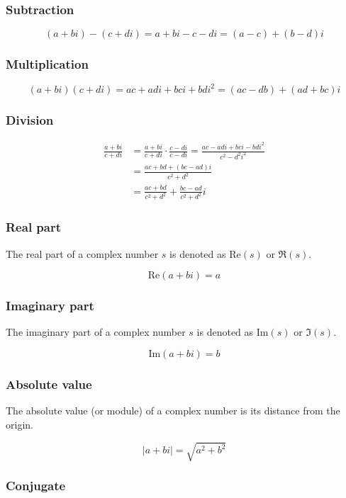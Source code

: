 \documentclass{article}
\begin{document}
\subsubsection{Subtraction}
\[
    (a+bi)-(c+di)=a+bi-c-di=(a-c)+(b-d)i
\]

\subsubsection{Multiplication}
\[
    (a+bi)(c+di)=ac+adi+bci+bdi^2=(ac-db)+(ad+bc)i
\]

\subsubsection{Division}
\begin{align*}
    \frac{a+bi}{c+di} &= \frac{a+bi}{c+di} \cdot \frac{c-di}{c-di} = \frac{ac-adi+bci-bdi^2}{c^2-d^2i^2}
    \\ &= \frac{ac+bd+(bc-ad)i}{c^2+d^2} \\ &= \frac{ac+bd}{c^2+d^2} + \frac{bc-ad}{c^2 + d^2}i
\end{align*}

\subsubsection{Real part}

The real part of a complex number \(s\) is denoted as \(\text{Re}(s)\) or \(\Re(s)\).

\[
    \text{Re}(a+bi) = a
\]

\subsubsection{Imaginary part}

The imaginary part of a complex number \(s\) is denoted as \(\text{Im}(s)\) or \(\Im(s)\).

\[
    \text{Im}(a+bi) = b
\]

\subsubsection{Absolute value}

The absolute value (or module) of a complex number is its distance from the origin.

\[
    |a+bi| = \sqrt{a^2 + b^2}
\]

\subsubsection{Conjugate}
\end{document}
